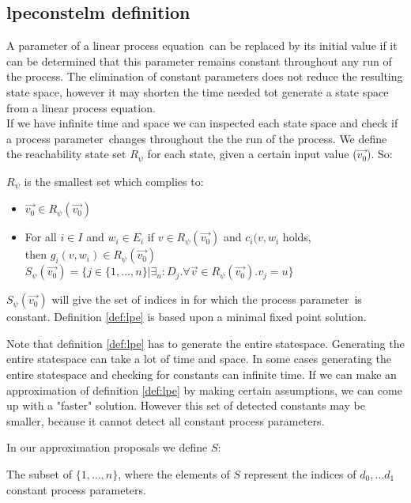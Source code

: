 \documentclass[a4paper,10pt]{article}
\newcommand{\lpe}{linear process equation}
\newcommand{\ovr}{\overrightarrow}
\newcommand{\pp}{process parameter}
\newcommand{\pps}{process parameters}
\begin{document}
\subsection{lpeconstelm definition}\label{subsec:lpedef}

A parameter of a \lpe\ can be replaced by its initial value if it can be determined that this parameter remains constant throughout any run of the process. The elimination of constant parameters does not reduce the resulting state space, however it may shorten the time needed tot generate a state space from a \lpe. \\
If we have infinite time and space we can inspected each state space and check if a \pp\ changes throughout the the run of the process. We define the reachability state set $R_{\psi}$ for each state, given a certain input value ($\ovr{v_0}$). So:
\begin{defn}\label{def:lpe}
$R_\psi$ is the smallest set which complies to:
\begin{itemize}
\item $\ovr{v_0} \in R_\psi(\ovr{v_0})$
\item For all $i \in I$ and $w_i \in E_i$ if $v \in R_\psi(\ovr{v_0})$ and $c_i(v, w_i$ holds, \\ then $g_i(v, w_i) \in R_\psi(\ovr{v_0})$ \\

$S_\psi(\ovr{v_0}) = \lbrace j \in  \lbrace 1, \ldots, n \rbrace \vert \exists_u : D_j . \forall \ovr{v} \in R_\psi(\ovr{v_0}) . v_j = u \rbrace $
\end{itemize}

$S_\psi(\ovr{v_0})$ will give the set of indices in for which the \pp\ is constant. Definition \ref{def:lpe} is based upon a minimal fixed point solution. 
\end{defn}

Note that definition \ref{def:lpe} has to generate the entire statespace. Generating the entire statespace can take a lot of time and space. In some cases generating the entire statespace and checking for constants can infinite time. If we can make an approximation of definition \ref{def:lpe} by making certain assumptions, we can come up with a "faster" solution. However this set of detected constants may be smaller, because it cannot detect all constant \pps .

In our approximation proposals we define $S$:
\begin{defn}
The subset of $\lbrace 1, \ldots, n \rbrace$, where the elements of $S$ represent the indices of $d_0, \ldots d_1$ constant \pps .
\end{defn}
\end{document}
